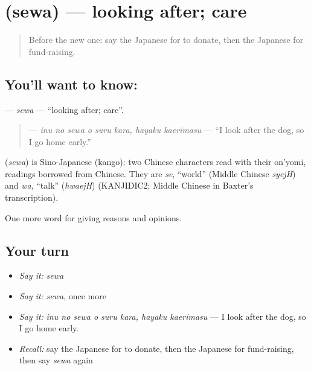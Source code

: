 \section[\texorpdfstring{\ja{せわ} (sewa)}{せわ (sewa)}]{ (sewa) — looking after; care}

\label{lesson:JA-C334-sewa}



\begin{quote}
Before the new one: say the Japanese for to donate, then the Japanese for fund-raising.
\end{quote}

\subsection*{You'll want to know: }
\textbf{} — \emph{sewa} — \textquotedblleft{}looking after; care\textquotedblright{}.

\begin{quote}
\textbf{   } — \emph{inu no sewa o suru kara, hayaku kaerimasu} — \textquotedblleft{}I look after the dog, so I go home early.\textquotedblright{}
\end{quote}

\begin{cousinweb}
\textbf{} (\emph{sewa}) is Sino-Japanese (kango): two Chinese characters read with their on'yomi, readings borrowed from Chinese. They are \emph{se}, \textquotedblleft{}world\textquotedblright{} (Middle Chinese \emph{syejH}) and \emph{wa}, \textquotedblleft{}talk\textquotedblright{} (\emph{hwaejH}) (KANJIDIC2; Middle Chinese in Baxter's transcription).
\end{cousinweb}

\begin{grammarlens}[title={What you've built}]
One more word for giving reasons and opinions.
\end{grammarlens}

\subsection*{Your turn}
\begin{itemize}
\raggedright
  \item \emph{Say it:} \emph{sewa}
  \item \emph{Say it:} \emph{sewa}, once more
  \item \emph{Say it:} \emph{inu no sewa o suru kara, hayaku kaerimasu} — I look after the dog, so I go home early.
  \item \emph{Recall:} say the Japanese for to donate, then the Japanese for fund-raising, then say \emph{sewa} again
\end{itemize}

